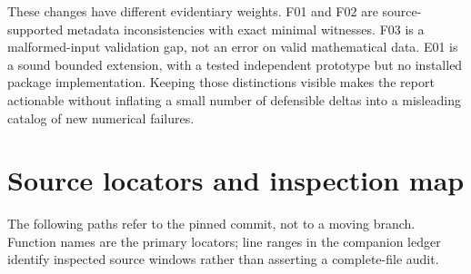 \documentclass[11pt,letterpaper]{article}
\begin{document}
These changes have different evidentiary weights. F01 and F02 are source-supported metadata inconsistencies with exact minimal witnesses. F03 is a malformed-input validation gap, not an error on valid mathematical data. E01 is a sound bounded extension, with a tested independent prototype but no installed package implementation. Keeping those distinctions visible makes the report actionable without inflating a small number of defensible deltas into a misleading catalog of new numerical failures.

\appendix
\section{Source locators and inspection map}
\label{app:sources}
The following paths refer to the pinned commit, not to a moving branch. Function names are the primary locators; line ranges in the companion ledger identify inspected source windows rather than asserting a complete-file audit.
\end{document}
